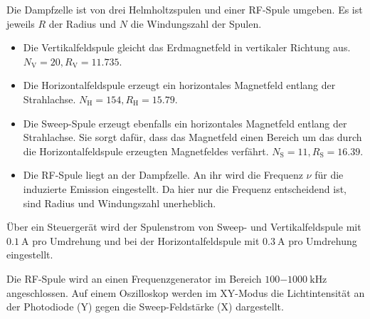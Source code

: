 	Die Dampfzelle ist von drei Helmholtzspulen und einer RF-Spule  
	umgeben. Es ist 
	jeweils $R$ der Radius und $N$ die Windungszahl der Spulen.
	\begin{itemize}
		\item Die Vertikalfeldspule gleicht das Erdmagnetfeld in 
			vertikaler Richtung aus. 
			$N_\text{V}=20 ,R_\text{V}=11.735$.
		\item Die Horizontalfeldspule erzeugt ein horizontales 
			Magnetfeld entlang der Strahlachse.
			$N_\text{H}= 154,R_\text{H}=15.79$.
		\item Die Sweep-Spule erzeugt ebenfalls ein horizontales 
			Magnetfeld entlang der Strahlachse. Sie sorgt dafür, dass 
			das Magnetfeld einen Bereich um das durch die 
			Horizontalfeldspule erzeugten Magnetfeldes verfährt.
			$N_\text{S}=11 ,R_\text{S}=16.39$.
		\item Die RF-Spule liegt an der Dampfzelle. An ihr 
			wird die Frequenz $\nu$ für die induzierte Emission 
			eingestellt. Da hier nur die Frequenz entscheidend ist, 
			sind Radius und Windungszahl unerheblich.
	\end{itemize}
	Über ein Steuergerät wird der Spulenstrom von Sweep- und 
	Vertikalfeldspule mit $\SI{0.1}{\ampere}$ pro Umdrehung und bei 
	der Horizontalfeldspule mit $\SI{0.3}{\ampere}$ pro Umdrehung 
	eingestellt. 
	
	Die RF-Spule wird an einen Frequenzgenerator im Bereich 
	$\SI{100-1000}{\kilo\hertz}$ angeschlossen. Auf einem Oszilloskop 
	werden im XY-Modus die Lichtintensität an der Photodiode (Y) gegen 
	die Sweep-Feldstärke (X) dargestellt.